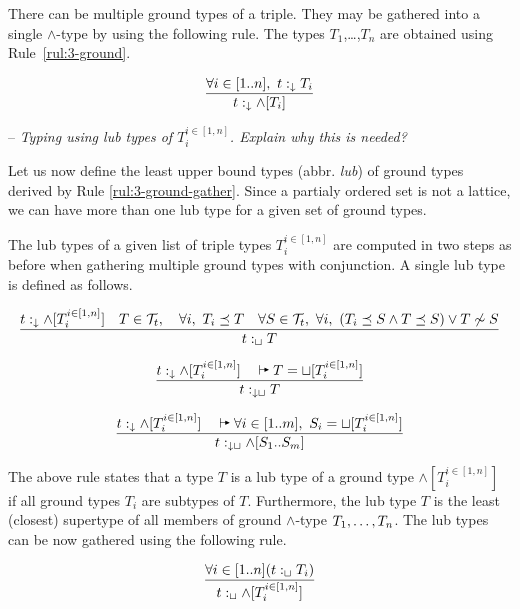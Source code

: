 \documentclass[runningheads]{llncs}
\newcommand{\darr}{\downarrow}
\newcommand{\vdasharr}{%
    \mathrel{%
        \vdash\hspace*{-5pt}%
        \raisebox{2.3pt}{\scalebox{.5}{\(\blacktriangleright\)}}%
    }%
}\newcommand{\D}{{\cal D}}
\newcommand{\T}{{\cal T}}
\newcommand{\notes}[1]{\noindent\begin{small}-- \emph{#1}\hfill\break\end{small}}
\begin{document}
There can be multiple ground types of a triple. They may be gathered
into a single $\land$-type by using the following rule. The types
$T_1$,\ldots,$T_n$ are obtained using Rule~\ref{rul:3-ground}.

\begin{equation}
\label{rul:3-ground-gather}
\dfrac{\forall\/i\in[1..n],\ t:_\darr\/T_i}
      {t:_\darr\land[T_i]}
\end{equation}


\notes{Typing using lub types of $T_i^{i\in[1,n]}$. Explain why this is needed?}

Let us now define the least upper bound types (abbr. \emph{lub}) of
ground types derived by Rule \ref{rul:3-ground-gather}. Since a
partialy ordered set is not a lattice, we can have more than one lub
type for a given set of ground types.

The lub types of a given list of triple types $T_i^{i\in[1,n]}$ are
computed in two steps as before when gathering multiple ground types
with conjunction. A single lub type is defined as follows.

\begin{equation}
\dfrac{t:_\darr\land[T_i^{i\in[1,n]}]\quad T\in\T_t,\quad \forall\/i,\ T_i\preceq\/T\quad \forall\/S\in\T_t,\ \forall\/i,\ (T_i\preceq\/S\land\/T\preceq\/S)\lor\/T\not\sim\/S}
      {t:_\sqcup\/T}
\end{equation}

\begin{equation}
\dfrac{t:_\darr\land[T_i^{i\in[1,n]}]\quad \vdasharr\/T=\sqcup[T_i^{i\in[1,n]}]}
      {t:_{\darr\sqcup}\/T}
\end{equation}

\begin{equation}
\dfrac{t:_\darr\land[T_i^{i\in[1,n]}]\quad \vdasharr\forall\/i\in[1..m],\ S_i=\sqcup[T_i^{i\in[1,n]}]}
      {t:_{\darr\sqcup}\land[S_1..S_m]}
\end{equation}

The above rule states that a type $T$ is a lub type of a ground type 
$\land[T_i^{i\in[1,n]}]$ if all ground types $T_i$ are subtypes of
$T$. Furthermore, the lub type $T$ is the least (closest) supertype of
all members of ground $\land$-type $T_1,\ldots\/,T_n$. The lub types
can be now gathered using the following rule.

\begin{equation}
\dfrac{\forall i\in[1..n](t:_\sqcup\/T_i)}
      {t:_\sqcup\land[T_i^{i\in[1,n]}]}
\end{equation}
\end{document}
